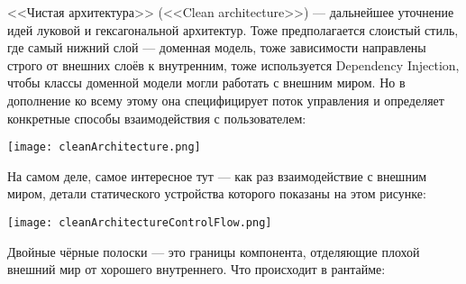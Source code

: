 \documentclass{../../text-style}
\begin{document}
<<Чистая архитектура>> (<<Clean architecture>>) --- дальнейшее уточнение идей луковой и гексагональной архитектур. Тоже предполагается слоистый стиль, где самый нижний слой --- доменная модель, тоже зависимости направлены строго от внешних слоёв к внутренним, тоже используется Dependency Injection, чтобы классы доменной модели могли работать с внешним миром. Но в дополнение ко всему этому она специфицирует поток управления и определяет конкретные способы взаимодействия с пользователем:

\begin{center}
    \texttt{[image: cleanArchitecture.png]}
\end{center}

На самом деле, самое интересное тут --- как раз взаимодействие с внешним миром, детали статического устройства которого показаны на этом рисунке:

\begin{center}
    \texttt{[image: cleanArchitectureControlFlow.png]}
\end{center}

Двойные чёрные полоски --- это границы компонента, отделяющие плохой внешний мир от хорошего внутреннего. Что происходит в рантайме:
\end{document}
